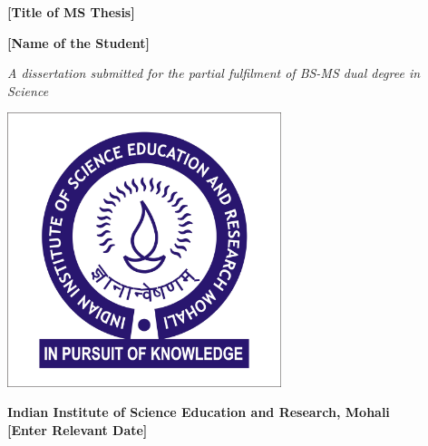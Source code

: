 \documentclass[a4paper, 12pt,  twoside,]{report}
\begin{document}
\date{\today}

\thispagestyle{empty}

\begin{titlepage}

\begin{center}
    \sffamily
    \LARGE
    \textbf{[Title of MS Thesis]}
    \vspace{1cm}
    
    \Large
    \textbf{[Name of the Student]}

    \vspace{1cm}
    \large
    
    \textit{A dissertation submitted for the partial fulfilment of
    BS-MS dual degree in Science}
    
    \vspace{3.5cm}

    \includegraphics[trim={5mm 5mm 5mm 5mm},clip,width=8cm]{HighResolutionLogo.jpg}
    \vspace{1cm}
    
    \large
    \textbf{Indian Institute of Science Education and Research, Mohali}\\
    \large
    \textbf{[Enter Relevant Date]} 

\end{center}


\end{titlepage}

\thispagestyle{empty}
\cleardoublepage
\end{document}
